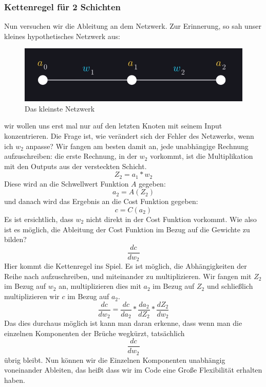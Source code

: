 \documentclass[12pt]{article}
\begin{document}
\subsubsection{Kettenregel für 2 Schichten}
Nun versuchen wir die Ableitung an dem Netzwerk. Zur Erinnerung, so sah unser kleines hypothetisches Netzwerk aus:
\begin{figure}[H]
\centering
\includegraphics[scale=0.40]{./Images/Pasted image 20230912184748.png}
\caption{Das kleinste Netzwerk}
\label{Das kleinste Netzwerk}
\end{figure}
wir wollen uns erst mal nur auf den letzten Knoten mit seinem Input konzentrieren. Die Frage ist, wie verändert sich der Fehler des Netzwerks, wenn ich $w_2$ anpasse?
Wir fangen am besten damit an, jede unabhängige Rechnung aufzuschreiben:
die erste Rechnung, in der $w_2$ vorkommt, ist die Multiplikation mit den Outputs aus der versteckten Schicht.
$$Z_2 = a_1*w_2$$
Diese wird an die Schwellwert Funktion $A$ gegeben:
$$a_2 = A(Z_2)$$
und danach wird das Ergebnis an die Cost Funktion gegeben:
$$c=C(a_2)$$
Es ist ersichtlich, dass $w_2$ nicht direkt in der Cost Funktion vorkommt. Wie also ist es möglich, die Ableitung der Cost Funktion im Bezug auf die Gewichte zu bilden?
$$\frac{dc}{dw_2}$$
Hier kommt die Kettenregel ins Spiel. Es ist möglich, die Abhängigkeiten der Reihe nach aufzuschreiben, und miteinander zu multiplizieren. 
Wir fangen mit $Z_2$ im Bezug auf $w_2$ an, multiplizieren dies mit $a_2$ im Bezug auf $Z_2$ und schließlich multiplizieren wir $c$ im Bezug auf $a_2$.
$$\frac{ dc }{ dw_{ 2 } }=
\frac{ dc }{ da_{ 2 } }*
\frac{ da_{ 2 } }{ dZ_{ 2 } }*
\frac{ dZ_{ 2 } }{ dw_{ 2 } }$$
Das dies durchaus möglich ist kann man daran erkenne, dass wenn man die einzelnen Komponenten der Brüche wegkürzt, tatsächlich $$\frac{ dc }{ dw_{ 2 } }$$  übrig bleibt.
Nun können wir die Einzelnen Komponenten unabhängig voneinander Ableiten, das heißt dass wir im Code eine Große Flexibilität erhalten haben.
\end{document}

